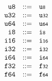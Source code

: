 \vspace{1ex}

$$
\begin{array}[t]{@{}lrrl@{}l@{}l@{}l@{}}
& {\mathtt{u8}} & ::= & {{\mathtt{u}}}{\mathsf{{\scriptstyle 8}}} \\
& {\mathtt{u32}} & ::= & {{\mathtt{u}}}{\mathsf{{\scriptstyle 32}}} \\
& {\mathtt{u64}} & ::= & {{\mathtt{u}}}{\mathsf{{\scriptstyle 64}}} \\
& {\mathtt{i8}} & ::= & {{\mathtt{i}}}{\mathsf{{\scriptstyle 8}}} \\
& {\mathtt{i16}} & ::= & {{\mathtt{i}}}{\mathsf{{\scriptstyle 16}}} \\
& {\mathtt{i32}} & ::= & {{\mathtt{i}}}{\mathsf{{\scriptstyle 32}}} \\
& {\mathtt{i64}} & ::= & {{\mathtt{i}}}{\mathsf{{\scriptstyle 64}}} \\
& {\mathtt{f32}} & ::= & {{\mathtt{f}}}{\mathsf{{\scriptstyle 32}}} \\
& {\mathtt{f64}} & ::= & {{\mathtt{f}}}{\mathsf{{\scriptstyle 64}}} \\
\end{array}
$$

\vspace{1ex}

